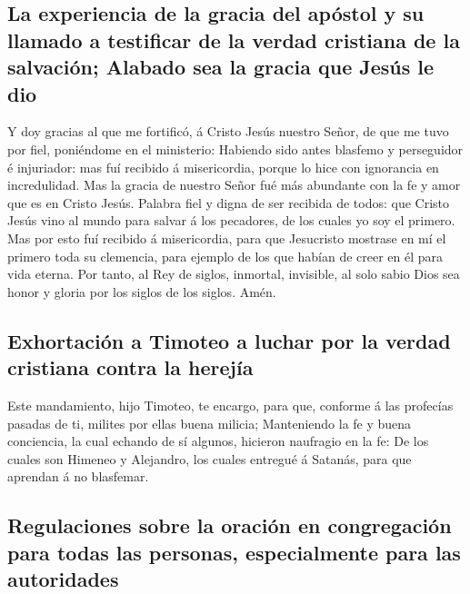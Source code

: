 \hypertarget{la-experiencia-de-la-gracia-del-apuxf3stol-y-su-llamado-a-testificar-de-la-verdad-cristiana-de-la-salvaciuxf3n-alabado-sea-la-gracia-que-jesuxfas-le-dio}{%
\subsection{La experiencia de la gracia del apóstol y su llamado a
testificar de la verdad cristiana de la salvación; Alabado sea la gracia
que Jesús le
dio}\label{la-experiencia-de-la-gracia-del-apuxf3stol-y-su-llamado-a-testificar-de-la-verdad-cristiana-de-la-salvaciuxf3n-alabado-sea-la-gracia-que-jesuxfas-le-dio}}

 Y doy gracias al que me fortificó, á Cristo Jesús nuestro
Señor, de que me tuvo por fiel, poniéndome en el ministerio:
 Habiendo sido antes blasfemo y perseguidor é injuriador:
mas fuí recibido á misericordia, porque lo hice con ignorancia en
incredulidad.  Mas la gracia de nuestro Señor fué más
abundante con la fe y amor que es en Cristo Jesús.  Palabra
fiel y digna de ser recibida de todos: que Cristo Jesús vino al mundo
para salvar á los pecadores, de los cuales yo soy el primero.
 Mas por esto fuí recibido á misericordia, para que
Jesucristo mostrase en mí el primero toda su clemencia, para ejemplo de
los que habían de creer en él para vida eterna.  Por tanto,
al Rey de siglos, inmortal, invisible, al solo sabio Dios sea honor y
gloria por los siglos de los siglos. Amén.

\hypertarget{exhortaciuxf3n-a-timoteo-a-luchar-por-la-verdad-cristiana-contra-la-herejuxeda}{%
\subsection{Exhortación a Timoteo a luchar por la verdad cristiana
contra la
herejía}\label{exhortaciuxf3n-a-timoteo-a-luchar-por-la-verdad-cristiana-contra-la-herejuxeda}}

 Este mandamiento, hijo Timoteo, te encargo, para que,
conforme á las profecías pasadas de ti, milites por ellas buena milicia;
 Manteniendo la fe y buena conciencia, la cual echando de
sí algunos, hicieron naufragio en la fe:  De los cuales son
Himeneo y Alejandro, los cuales entregué á Satanás, para que aprendan á
no blasfemar.

\hypertarget{regulaciones-sobre-la-oraciuxf3n-en-congregaciuxf3n-para-todas-las-personas-especialmente-para-las-autoridades}{%
\subsection{Regulaciones sobre la oración en congregación para todas las
personas, especialmente para las
autoridades}\label{regulaciones-sobre-la-oraciuxf3n-en-congregaciuxf3n-para-todas-las-personas-especialmente-para-las-autoridades}}

